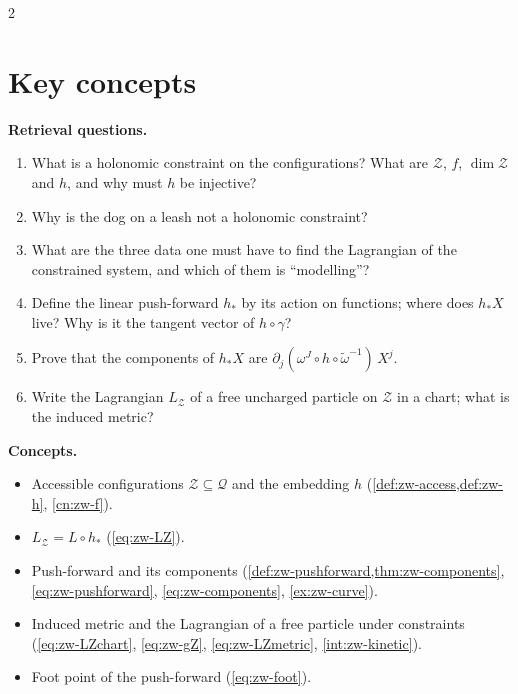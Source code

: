 \begin{paracol}{2}
\section*{Key concepts}
\begin{keyconcepts}
\textbf{Retrieval questions.}
\begin{enumerate}
  \item What is a holonomic constraint on the configurations? What are $\mathcal Z$, $f$, $\dim\mathcal Z$ and $h$, and why must $h$ be injective?
  \item Why is the dog on a leash not a holonomic constraint?
  \item What are the three data one must have to find the Lagrangian of the constrained system, and which of them is ``modelling''?
  \item Define the linear push-forward $h_*$ by its action on functions; where does $h_*X$ live? Why is it the tangent vector of $h\circ\gamma$?
  \item Prove that the components of $h_*X$ are $\partial_j(\omega^J\circ h\circ\tilde\omega^{-1})\,X^j$.
  \item Write the Lagrangian $L_{\mathcal Z}$ of a free uncharged particle on $\mathcal Z$ in a chart; what is the induced metric?
\end{enumerate}
\textbf{Concepts.}
\begin{itemize}
  \item Accessible configurations $\mathcal Z\subseteq\mathcal Q$ and the embedding $h$ (\cref{def:zw-access,def:zw-h}, \cref{cn:zw-f}).
  \item $L_{\mathcal Z}=L\circ h_*$ (\eqref{eq:zw-LZ}).
  \item Push-forward and its components (\cref{def:zw-pushforward,thm:zw-components}, \eqref{eq:zw-pushforward}, \eqref{eq:zw-components}, \cref{ex:zw-curve}).
  \item Induced metric and the Lagrangian of a free particle under constraints (\eqref{eq:zw-LZchart}, \eqref{eq:zw-gZ}, \eqref{eq:zw-LZmetric}, \cref{int:zw-kinetic}).
  \item Foot point of the push-forward (\eqref{eq:zw-foot}).
\end{itemize}
\end{keyconcepts}

\flushside
\end{paracol}
